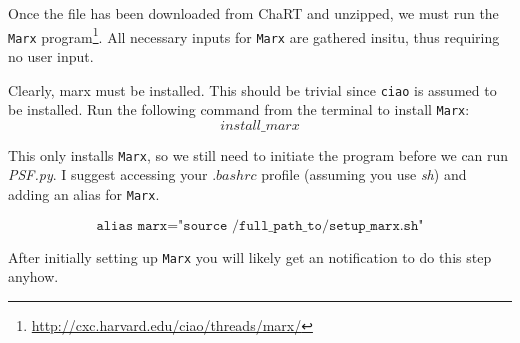 \documentclass[11pt,letterpaper]{article}
\begin{document}
Once the file has been downloaded from ChaRT and unzipped, we must run the \texttt{Marx} program\footnote{\href{http://cxc.harvard.edu/ciao/threads/marx/}{http://cxc.harvard.edu/ciao/threads/marx/}}. All necessary inputs for \texttt{Marx} are gathered insitu, thus requiring no user input.

Clearly, marx must be installed. This should be trivial since \texttt{ciao} is assumed to be installed. Run the following command from the terminal to install \texttt{Marx}:
$$install\_marx$$

This only installs \texttt{Marx}, so we still need to initiate the program before we can run \textit{PSF.py}. I suggest accessing your $.bashrc$ profile (assuming you use \textit{sh}) and adding an alias for \texttt{Marx}.

$$\texttt{alias marx="source  /full\_path\_to/setup\_marx.sh"} $$

After initially setting up \texttt{Marx} you will likely get an notification to do this step anyhow.
\end{document}

